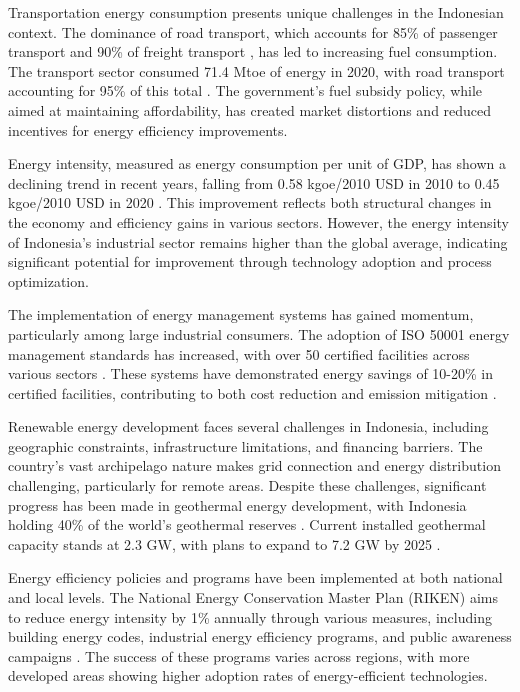 Transportation energy consumption presents unique challenges in the Indonesian context. The dominance of road transport, which accounts for 85\% of passenger transport and 90\% of freight transport \cite{BPS2021}, has led to increasing fuel consumption. The transport sector consumed 71.4 Mtoe of energy in 2020, with road transport accounting for 95\% of this total \cite{IEA2021}. The government's fuel subsidy policy, while aimed at maintaining affordability, has created market distortions and reduced incentives for energy efficiency improvements.

Energy intensity, measured as energy consumption per unit of GDP, has shown a declining trend in recent years, falling from 0.58 kgoe/2010 USD in 2010 to 0.45 kgoe/2010 USD in 2020 \cite{IEA2021}. This improvement reflects both structural changes in the economy and efficiency gains in various sectors. However, the energy intensity of Indonesia's industrial sector remains higher than the global average, indicating significant potential for improvement through technology adoption and process optimization.

The implementation of energy management systems has gained momentum, particularly among large industrial consumers. The adoption of ISO 50001 energy management standards has increased, with over 50 certified facilities across various sectors \cite{BSI2021}. These systems have demonstrated energy savings of 10-20\% in certified facilities, contributing to both cost reduction and emission mitigation \cite{ESDM2019}.

Renewable energy development faces several challenges in Indonesia, including geographic constraints, infrastructure limitations, and financing barriers. The country's vast archipelago nature makes grid connection and energy distribution challenging, particularly for remote areas. Despite these challenges, significant progress has been made in geothermal energy development, with Indonesia holding 40\% of the world's geothermal reserves \cite{MEMR2021}. Current installed geothermal capacity stands at 2.3 GW, with plans to expand to 7.2 GW by 2025 \cite{PLN2021}.

Energy efficiency policies and programs have been implemented at both national and local levels. The National Energy Conservation Master Plan (RIKEN) aims to reduce energy intensity by 1\% annually through various measures, including building energy codes, industrial energy efficiency programs, and public awareness campaigns \cite{ESDM2020}. The success of these programs varies across regions, with more developed areas showing higher adoption rates of energy-efficient technologies.


